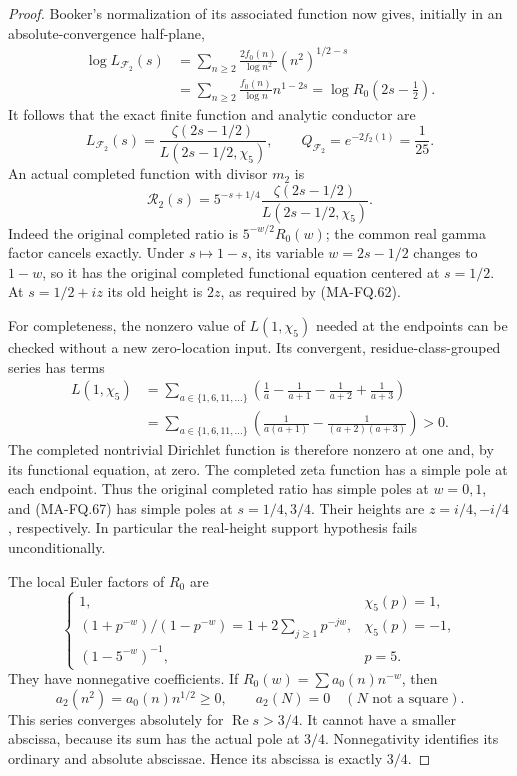 \begin{proof}
Booker's normalization of its associated function now gives,
initially in an absolute-convergence half-plane,
\[
 \begin{aligned}
 \log L_{\mathcal F_2}(s)
   &=\sum_{n\ge2}\frac{2f_0(n)}{\log n^2}
                              (n^2)^{1/2-s}\\
   &=\sum_{n\ge2}\frac{f_0(n)}{\log n}n^{1-2s}
     =\log R_0(2s-\tfrac12).
 \end{aligned}
 \tag{MA-FQ.65}
\]
It follows that the exact finite function and analytic conductor
are
\[
 L_{\mathcal F_2}(s)
      =\frac{\zeta(2s-1/2)}{L(2s-1/2,\chi_5)},\qquad
 Q_{\mathcal F_2}=e^{-2f_2(1)}=\frac1{25}.
 \tag{MA-FQ.66}
\]
An actual completed function with divisor $m_2$ is
\[
 \mathscr R_2(s)=5^{-s+1/4}
                    \frac{\zeta(2s-1/2)}{L(2s-1/2,\chi_5)}.
 \tag{MA-FQ.67}
\]
Indeed the original completed ratio is $5^{-w/2}R_0(w)$;
the common real gamma factor cancels exactly.  Under
$s\mapsto1-s$, its variable $w=2s-1/2$ changes to $1-w$,
so it has the original completed functional equation centered
at $s=1/2$.  At $s=1/2+iz$ its old height is $2z$, as
required by (MA-FQ.62).

For completeness, the nonzero value of $L(1,\chi_5)$ needed
at the endpoints can be checked without a new zero-location
input.  Its convergent, residue-class-grouped series has terms
\[
 \begin{aligned}
 L(1,\chi_5)
 &=\sum_{a\in\{1,6,11,\ldots\}}
       \left(\frac1a-\frac1{a+1}-\frac1{a+2}
                                      +\frac1{a+3}\right)\\
 &=\sum_{a\in\{1,6,11,\ldots\}}
       \left(\frac1{a(a+1)}-
                          \frac1{(a+2)(a+3)}\right)>0.
 \end{aligned}
 \tag{MA-FQ.68}
\]
The completed nontrivial Dirichlet function is therefore
nonzero at one and, by its functional equation, at zero.
The completed zeta function has a simple pole at each endpoint.
Thus the original completed ratio has simple poles at $w=0,1$,
and (MA-FQ.67) has simple poles at $s=1/4,3/4$.
Their heights are $z=i/4,-i/4$, respectively.  In particular
the real-height support hypothesis fails unconditionally.

The local Euler factors of $R_0$ are
\[
 \begin{cases}
  1,&\chi_5(p)=1,\\
  (1+p^{-w})/(1-p^{-w})
          =1+2\sum_{j\ge1}p^{-jw},&\chi_5(p)=-1,\\
  (1-5^{-w})^{-1},&p=5.
 \end{cases}
 \tag{MA-FQ.69}
\]
They have nonnegative coefficients.  If
$R_0(w)=\sum a_0(n)n^{-w}$, then
\[
 a_2(n^2)=a_0(n)n^{1/2}\ge0,
 \qquad a_2(N)=0\quad(N\text{ not a square}).
 \tag{MA-FQ.70}
\]
This series converges absolutely for $\operatorname{Re}s>3/4$.
It cannot have a smaller abscissa, because its sum has the
actual pole at $3/4$.  Nonnegativity identifies its ordinary
and absolute abscissae.  Hence its abscissa is exactly $3/4$.


\end{proof}
